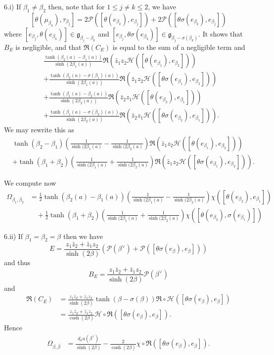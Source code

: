 \documentclass{amsart}
\theoremstyle{definition}
\begin{document}
6.i) 
If $\beta_1\neq \beta_2$ then, note that for $1\leq j\neq k\leq 2$, 
we have 
\[
[\theta(\mu_{\beta_k}),\tau_{\beta_j}]=2\mathcal{P}([\theta(e_{\beta_k}),e_{\beta_j}])+
2\mathcal{P}([\theta\sigma(e_{\beta_k}),e_{\beta_j}])
\]
where $[e_{\beta_j},\theta(e_{\beta_k})]\in \mathfrak{g}_{\beta_j-\beta_k}$
and $[e_{\beta_j},\theta\sigma(e_{\beta_k})]\in\mathfrak{g}_{\beta_j-\sigma(\beta_k)}$.
It shows that $B_E$ is negligible, and that $\Re(C_E)$ is equal to 
the sum of a negligible term and 
\begin{align*}
&\frac{\tanh(\beta_2(a)-\beta_1(a))}{\sinh(2\beta_1(a))}\Re(\bar{z}_1z_2\mathcal{H}([\theta(e_{\beta_1}),e_{\beta_2}])) \\
&+ \frac{\tanh(\beta_2(a)-\sigma(\beta_1)(a))}{\sinh(2\beta_1(a))}\Re(\bar{z}_1z_2\mathcal{H}([\theta\sigma(e_{\beta_1}),e_{\beta_2}])) \\
&+\frac{\tanh(\beta_1(a)-\beta_2(a))}{\sinh(2\beta_2(a))}\Re(\bar{z}_2z_1\mathcal{H}([\theta(e_{\beta_2}),e_{\beta_1}])) \\
&+ \frac{\tanh(\beta_1(a)-\sigma(\beta_2)(a))}{\sinh(2\beta_2(a))}\Re(\bar{z}_2z_1\mathcal{H}([\theta\sigma(e_{\beta_2}),e_{\beta_1}])).
\end{align*}
We may rewrite this as 
\begin{align*}
&\tanh(\beta_2-\beta_1)(\frac{1}{\sinh(2\beta_1(a)}-\frac{1}{\sinh(2\beta_2(a)})\Re(\bar{z}_1z_2\mathcal{H}([\theta(e_{\beta_1}),e_{\beta_2}])) \\
&+ \tanh(\beta_1+\beta_2)(\frac{1}{\sinh(2\beta_1(a)}+\frac{1}{\sinh(2\beta_2(a)})\Re(\bar{z}_1z_2\mathcal{H}([\theta\sigma(e_{\beta_1}),e_{\beta_2}])).
\end{align*}

We compute now 
\begin{align*}
\Omega_{\beta_1,\bar{\beta}_2} & =
\frac{1}{2}\tanh(\beta_2(a)-\beta_1(a))(\frac{1}{\sinh(2\beta_1(a)}-\frac{1}{\sinh(2\beta_2(a)})\chi([\theta(e_{\beta_2}),e_{\beta_1}]) \\
& \quad + \frac{1}{2}\tanh(\beta_1+\beta_2)(\frac{1}{\sinh(2\beta_1(a)}+\frac{1}{\sinh(2\beta_2(a)})\chi([\theta(e_{\beta_2}),\sigma(e_{\beta_1})]) 
\end{align*}

6.ii) 
If $\beta_1 = \beta_2 = \beta$ then we have
\[
E=\frac{z_1\bar{z}_2+\bar{z}_1z_2}{\sinh(2\beta)}(\mathcal{P}(\beta^{\vee})+\mathcal{P}([\theta\sigma(e_{\beta}),e_{\beta}]))
\]
and thus 
\[
B_E = \frac{z_1\bar{z}_2+\bar{z}_1z_2}{\sinh(2\beta)}\mathcal{P}(\beta^{\vee})
\] 
and 
\begin{align*}
\Re(C_E)&=\frac{z_1\bar{z}_2+\bar{z}_1z_2}{\sinh(2\beta)}\tanh(\beta-\sigma(\beta))\Re\circ\mathcal{H}([\theta\sigma(e_{\beta}),e_{\beta}]) \\
&=\frac{z_1\bar{z}_2+\bar{z}_1z_2}{\cosh(2\beta)}\mathcal{H}\circ\Re([\theta\sigma(e_{\beta}),e_{\beta}]).
\end{align*} 
Hence 
\begin{align*}
\Omega_{\beta,\bar{\beta}}&= \frac{d_au(\beta^{\vee})}{\sinh(2\beta)} 
-\frac{2}{\cosh(2\beta)}\chi\circ\Re([\theta\sigma(e_{\beta}),e_{\beta}]).
\end{align*}
\end{document}
